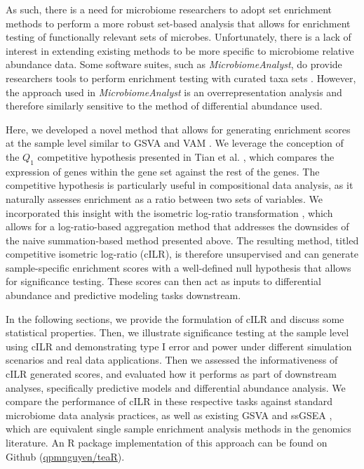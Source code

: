 \documentclass{article}
\begin{document}
As such, there is a need for microbiome researchers to adopt set enrichment methods to perform a more robust set-based analysis that allows for enrichment testing of functionally relevant sets of microbes. Unfortunately, there is a lack of interest in extending existing methods to be more specific to microbiome relative abundance data. Some software suites, such as \emph{MicrobiomeAnalyst}, do provide researchers tools to perform enrichment testing with curated taxa sets \cite{chong2020}. However, the approach used in \emph{MicrobiomeAnalyst} is an overrepresentation analysis and therefore similarly sensitive to the method of differential abundance used. 

Here, we developed a novel method that allows for generating enrichment scores at the sample level similar to GSVA \cite{hanzelmann2013} and VAM \cite{frost2020a}. We leverage the conception of the $Q_1$ competitive hypothesis presented in Tian et al. \cite{tian2005}, which compares the expression of genes within the gene set against the rest of the genes. The competitive hypothesis is particularly useful in compositional data analysis, as it naturally assesses enrichment as a ratio between two sets of variables. We incorporated this insight with the isometric log-ratio transformation \cite{egozcue2003}, which allows for a log-ratio-based aggregation method that addresses the downsides of the naive summation-based method presented above. The resulting method, titled competitive isometric log-ratio (cILR), is therefore unsupervised and can generate sample-specific enrichment scores with a well-defined null hypothesis that allows for significance testing. These scores can then act as inputs to differential abundance and predictive modeling tasks downstream. 

In the following sections, we provide the formulation of cILR and discuss some statistical properties. Then, we illustrate significance testing at the sample level using cILR and demonstrating type I error and power under different simulation scenarios and real data applications. Then we assessed the informativeness of cILR generated scores, and evaluated how it performs as part of downstream analyses, specifically predictive models and differential abundance analysis. We compare the performance of cILR in these respective tasks against standard microbiome data analysis practices, as well as existing GSVA \cite{hanzelmann2013} and ssGSEA \cite{barbie2009}, which are equivalent single sample enrichment analysis methods in the genomics literature. An R package implementation of this approach can be found on Github (\href{www.github.com/qpmnguyen/teaR}{qpmnguyen/teaR}).
\end{document}
